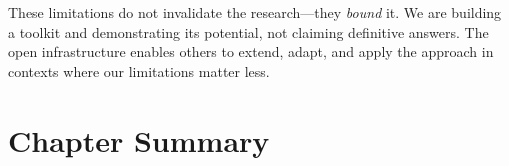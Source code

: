 \documentclass[../main.tex]{subfiles}
\begin{document}
These limitations do not invalidate the research---they \emph{bound} it. We are building a toolkit and demonstrating its potential, not claiming definitive answers. The open infrastructure enables others to extend, adapt, and apply the approach in contexts where our limitations matter less.

\clearpage
\section{Chapter Summary}
\end{document}

